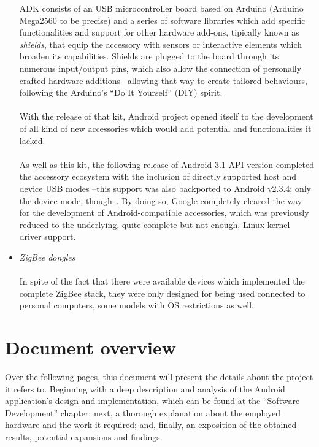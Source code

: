 \begin{itemize}
				ADK consists of an USB microcontroller board based on Arduino (Arduino Mega2560 to be precise) and a
				series of software libraries which add specific functionalities and support for other hardware add-ons,
				tipically known as \emph{shields}, that equip the accessory with sensors or interactive elements
				which broaden its capabilities. Shields are plugged to the board through its numerous input/output
				pins, which also allow the connection of personally crafted hardware additions --allowing that way to
				create tailored behaviours, following the Arduino's ``Do It Yourself'' (DIY) spirit.\\\\
				With the release of that kit, Android project opened itself to the development
				of all kind of new accessories which would add potential and functionalities
				it lacked.\\\\
				As well as this kit, the following release of Android 3.1 API version completed
				the accessory ecosystem with the inclusion of directly supported host and device
				USB modes --this support was also backported to Android v2.3.4; only the device mode, though--.
				By doing so, Google completely cleared the way for the development of Android-compatible accessories, 
				which was previously reduced to the underlying, quite complete but not enough, Linux kernel driver 
				support.\\
			\item \emph{ZigBee dongles}\\\\
				In spite of the fact that there were available devices which implemented the complete ZigBee stack,
				they were only designed for being used connected to personal computers, some models with OS 
				restrictions as well.\\
		\end{itemize}
	
		
	
	\section{Document overview}
		Over the following pages, this document will present the details about the project it refers to.
		Beginning with a deep description and analysis of the Android application's design and implementation,
		which can be found at the ``Software Development'' chapter; next, a thorough explanation about the
		employed hardware and the work it required; and, finally, an exposition of the obtained results,
		potential expansions and findings.  

